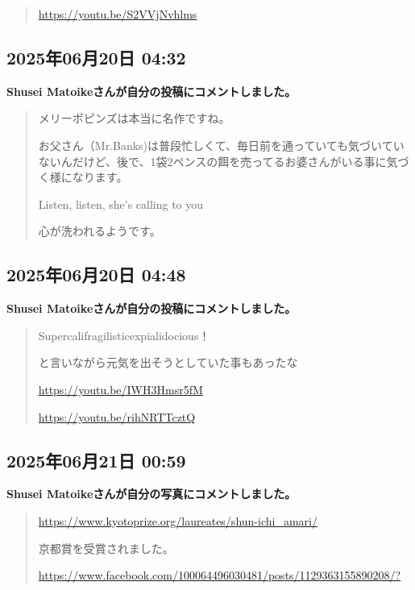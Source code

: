 \begin{quote}
\url{https://youtu.be/S2VVjNvhlms}
\end{quote}

\subsection*{2025年06月20日 04:32}

\textbf{Shusei Matoikeさんが自分の投稿にコメントしました。}

\begin{quote}
メリーポピンズは本当に名作ですね。

お父さん（Mr.Banks)は普段忙しくて、毎日前を通っていても気づいていないんだけど、後で、1袋2ペンスの餌を売ってるお婆さんがいる事に気づく様になります。

Listen, listen, she's calling to you

心が洗われるようです。
\end{quote}

\subsection*{2025年06月20日 04:48}

\textbf{Shusei Matoikeさんが自分の投稿にコメントしました。}

\begin{quote}
Supercalifragilisticexpialidocious！

と言いながら元気を出そうとしていた事もあったな

\url{https://youtu.be/IWH3Hmsr5fM}

\url{https://youtu.be/rihNRTTcztQ}
\end{quote}

\subsection*{2025年06月21日 00:59}

\textbf{Shusei Matoikeさんが自分の写真にコメントしました。}

\begin{quote}
\url{https://www.kyotoprize.org/laureates/shun-ichi_amari/}

京都賞を受賞されました。

\url{https://www.facebook.com/100064496030481/posts/1129363155890208/?}
\end{quote}

